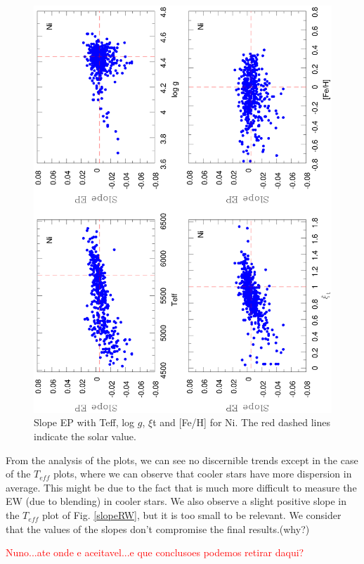 \documentclass[dvips,12pt,a4paper]{report}
\begin{document}
{{\begin{figure}[h]
\centering
\includegraphics[width=9.5 cm, angle=-90]{pics/parte3/EP.eps}
\caption[Slope EP with Teff, log $g$, $\xi$t and metallicity for Ni]{Slope EP with Teff, log $g$, $\xi$t and [Fe/H] for Ni. The red dashed lines indicate the solar value.}
\label{slopeEP}
\end{figure}

From the analysis of the plots, we can see no discernible trends except in the case of the $T_{eff}$ plots, where we can observe that cooler stars  have more dispersion in average. This might be due to the fact that is much more difficult to measure the EW (due to blending) in cooler stars. We also observe a slight positive slope in the $T_{eff}$ plot of Fig. \ref{slopeRW}, but it is too small to be relevant. We consider that the values of the slopes don't compromise the final results.(why?) \begin{tiny} \textcolor{red}{Nuno...ate onde e aceitavel...e que conclusoes podemos retirar daqui?}\end{tiny}

}}
\end{document}
